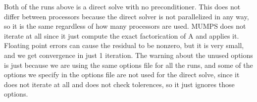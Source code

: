 \documentclass[12pt]{article}
\begin{document}
Both of the runs above is a direct solve with no preconditioner. This does not differ between processors because the direct solver is not parallelized in any way, so it is the same regardless of how many processors are used. MUMPS does not iterate at all since it just compute the exact factorication of A and applies it. Floating point errors can cause the residual to be nonzero, but it is very small, and we get convergence in just 1 iteration. 
The warning about the unused options is just because we are using the same options file for all the runs, and some of the options we specify in the options file are not used for the direct solve, since it does not iterate at all and does not check tolerences, so it just ignores those options.
\end{document}
